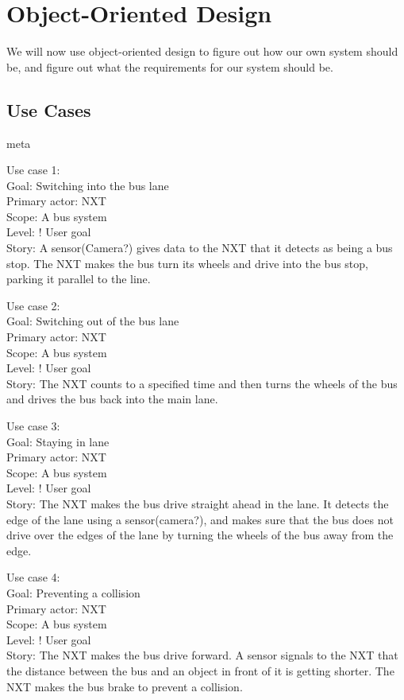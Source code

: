 \section{Object-Oriented Design}

We will now use object-oriented design to figure out how our own system should be, and figure out what the requirements for our system should be.

\subsection{Use Cases}
meta

Use case 1:\\
Goal: Switching into the bus lane\\
Primary actor: NXT\\
Scope: A bus system\\
Level: ! User goal\\
Story: A sensor(Camera?) gives data to the NXT that it detects as being a bus stop. The NXT makes the bus turn its wheels and drive into the bus stop, parking it parallel to the line.

Use case 2:\\
Goal: Switching out of the bus lane\\
Primary actor: NXT\\
Scope: A bus system\\
Level: ! User goal\\
Story: The NXT counts to a specified time and then turns the wheels of the bus and drives the bus back into the main lane.

Use case 3:\\
Goal: Staying in lane\\
Primary actor: NXT\\
Scope: A bus system\\
Level: ! User goal\\
Story: The NXT makes the bus drive straight ahead in the lane. It detects the edge of the lane using a sensor(camera?), and makes sure that the bus does not drive over the edges of the lane by turning the wheels of the bus away from the edge.

Use case 4:\\
Goal: Preventing a collision\\
Primary actor: NXT\\
Scope: A bus system\\
Level: ! User goal\\
Story: The NXT makes the bus drive forward. A sensor signals to the NXT that the distance between the bus and an object in front of it is getting shorter. The NXT makes the bus brake to prevent a collision.

